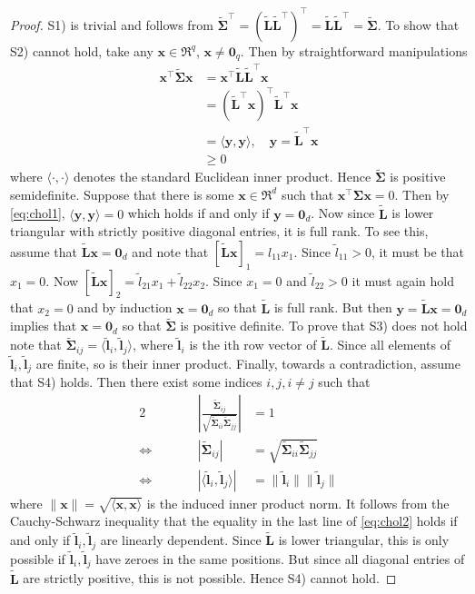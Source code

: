\documentclass[11pt, a4paper]{article}
\newcommand*{\bb}{\boldsymbol}
\theoremstyle{example} \newtheorem{example}{Example}[section]
\theoremstyle{theorem} \newtheorem{theorem}{Theorem}[section]
\theoremstyle{theorem }\newtheorem{proposition}{Proposition}[section]
\theoremstyle{theorem }\newtheorem{corollary}{Corollary}[section]
\def\\bbeta{\bb{\\bbeta}}
\begin{document}
\begin{proof}
	S1) is trivial and follows from $\tilde{\bb \Sigma}^\top =  (\tilde{\bb L}\tilde{\bb L}^\top)^\top = \tilde{\bb L}\tilde{\bb L}^\top = \tilde{\bb \Sigma}$.
	To show that S2) cannot hold, take any $\bb x\in \Re^q$, $\bb x\neq \bb 0_q$. Then by straightforward manipulations 
	\begin{equation}
	\label{eq:chol1}
	\begin{aligned}
	\bb x^\top\tilde{\bb \Sigma}\bb x &= \bb x^\top\tilde{\bb L}\tilde{\bb L}^\top\bb x\\ 
	&= (\tilde{\bb L}^\top\bb x)^\top\tilde{\bb L}^\top\bb x \\ 
	&= \langle \bb y,\bb y\rangle, \quad \bb y=\tilde{\bb L}^\top\bb x\\
	&\geq 0
	\end{aligned}
	\end{equation}
	where $\langle\cdot,\cdot\rangle$ denotes the standard Euclidean inner product. Hence $\tilde{\bb \Sigma}$ is positive semidefinite. Suppose that there is some $\bb x \in \Re^d$ such that $\bb x^\top \bb \Sigma \bb x=0$. Then by \eqref{eq:chol1}, $\langle \bb y,\bb y \rangle = 0$ which holds if and only if $\bb y=\bb 0_d$. Now since $\tilde{\bb L}$ is lower triangular with strictly positive diagonal entries, it is full rank. To see this, assume that $\tilde{\bb L}\bb x=\bb 0_d$ and note that $[\tilde{\bb L}\bb x]_1 = l_{11}x_1$. Since $\tilde{l}_{11}>0$, it must be that $x_1=0$. Now $[\tilde{\bb L}\bb x]_2 = \tilde{l}_{21}x_1+\tilde{l}_{22}x_2$. Since $x_1=0$ and $\tilde{l}_{22}>0$ it must again hold that $x_2=0$ and by induction $\bb x=\bb 0_d$ so that $\tilde{\bb L}$ is full rank. But then $\bb y = \tilde{\bb L}\bb x=\bb 0_d$ implies that $\bb x = \bb 0_d$ so that $\tilde{\bb \Sigma}$ is positive definite. 
	To prove that S3) does not hold note that $\tilde{\bb \Sigma}_{ij} = \langle \tilde{\bb l}_i,\tilde{\bb l}_j \rangle$, where $\tilde{\bb l}_i$ is the ith row vector of $\tilde{\bb L}$. Since all elements of $\tilde{\bb l}_i,\tilde{\bb l}_j$ are finite, so is their inner product.  
	Finally, towards a contradiction, assume that S4) holds. Then there exist some indices $i,j, i \neq j$ such that 
	\begin{alignat}{2}\label{eq:chol2}
	&\qquad& 
	\left|\frac{\tilde{\bb \Sigma}_{ij} }{\sqrt{ \tilde{\bb \Sigma}_{ii} \tilde{\bb \Sigma}_{jj}}}\right|&=1 \\ 
	\iff&& |\tilde{\bb \Sigma}_{ij}| &= \sqrt{ \tilde{\bb \Sigma}_{ii} \tilde{\bb \Sigma}_{jj}} \\ 
	\iff && |\langle \tilde{\bb l}_i,\tilde{\bb l}_j\rangle| &= \|\tilde{\bb l}_i\|\|\tilde{\bb l}_j\|
	\end{alignat}
	where $\|\bb x\|= \sqrt{\langle\bb x ,\bb x\rangle}$ is the induced inner product norm. It follows from the Cauchy-Schwarz inequality that the equality in the last line of \eqref{eq:chol2} holds if and only if $\tilde{\bb l}_i,\tilde{\bb l}_j$ are linearly dependent. Since $\tilde{\bb L}$ is lower triangular, this is only possible if $\tilde{\bb l}_i,\tilde{\bb l}_j$ have zeroes in the same positions. But since all diagonal entries of $\tilde{\bb L}$ are strictly positive, this is not possible. Hence S4) cannot hold. 
\end{proof}
\end{document}
